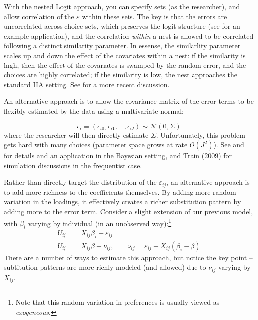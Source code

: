 \documentclass{tufte-handout}
\theoremstyle{break}
\newtheorem{exmp}{Example}
\begin{document}
With the nested Logit approach, you can specify sets (as the researcher), and allow correlation of the $\varepsilon$ within these sets. The key is that the errors are uncorrelated across choice sets, which preserves the logit structure (see \citet{goldberg1995product} for an example application), and the correlation \emph{within} a nest is allowed to be correlated following a distinct similarity parameter. In essense, the similarlity parameter scales up and down the effect of the covariates within a nest: if the similarity is high, then the effect of the covariates is swamped by the random error, and the choices are highly correlated; if the similarity is low, the nest approaches the standard IIA setting. See \citet{wen2001generalized} for a more recent discussion.
    
An alternative approach is to allow the covariance matrix of the error terms to be flexibly estimated by the data using a multivariate normal:

\begin{equation}
  \epsilon_{i} = (\epsilon_{i0},\epsilon_{i1},\ldots, \epsilon_{iJ}) \sim \mathcal{N}(0, \Sigma)
\end{equation}
where the researcher will then directly estimate $\Sigma$.  Unfortunately, this problem gets hard with many choices (parameter space grows at rate $O(J^{2})$).   See \citet{mcculloch2000bayesian} and \citet{geweke2003bayesian} for details and an application in the Bayesian setting, and Train (2009) for simulation discussions in  the frequentist case.



Rather than directly target the distribution of the $\varepsilon_{ij}$, an alternative approach is to add more richness to the coefficients themselves. By adding more random variation in the loadings, it effectively creates a richer substitution pattern by adding more to the error term.  Consider a slight extension of our previous model, with $\beta_{i}$ varying by individual (in an unobserved way):\footnote{Note that this random variation in preferences is usually viewed as \emph{exogeneous}.}
\begin{align*}
U_{ij} &= X_{ij}\beta_{i} + \varepsilon_{ij}\\
U_{ij} &= X_{ij}\overline{\beta} + \nu_{ij}, \qquad \nu_{ij} = \varepsilon_{ij} + X_{ij}(\beta_{i}-\overline{\beta})
\end{align*}
There are a number of ways to estimate this approach, but notice the key point -- subtitution patterns are more richly modeled (and allowed) due to $\nu_{ij}$ varying by $X_{ij}$. 
\end{document}
